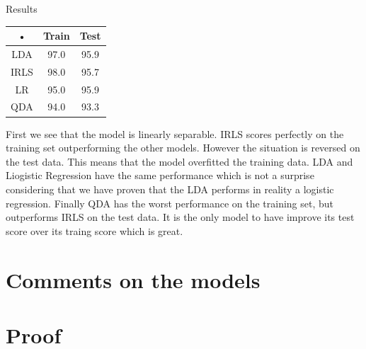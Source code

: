 \documentclass[a4paper]{article}
\begin{document}
\begin{minipage}[c]{0,35\textwidth}
Results\\
\begin{tabular}{|c|c|c|}
\hline 
• & Train & Test \\ 
\hline 
LDA & 97.0 & 95.9 \\ 
\hline 
IRLS & 98.0 & 95.7 \\ 
\hline 
LR & 95.0 & 95.9 \\ 
\hline 
QDA & 94.0 & 93.3 \\ 
\hline 
\end{tabular} 
\end{minipage}
\begin{minipage}{0,6\textwidth}
First we see that the model is linearly separable. IRLS scores perfectly on the training set outperforming the other models. However the situation is reversed on the test data. This means that the model overfitted the training data. LDA and Liogistic Regression have the same performance which is not a surprise considering that we have proven that the LDA performs in reality a logistic regression. Finally QDA has the worst performance on the training set, but outperforms IRLS on the test data. It is the only model to have improve its test score over its traing score which is great.
\end{minipage}
\newpage
\section{Comments on the models}
\newpage
\section{Proof}
\end{document}
